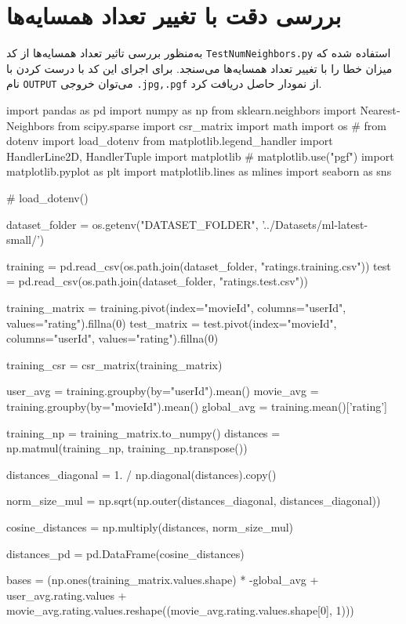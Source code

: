 \chapter{بررسی دقت با تغییر تعداد همسایه‌ها}

به‌منظور بررسی تاثیر تعداد همسایه‌ها از کد
\verb;TestNumNeighbors.py;
استفاده شده که میزان خطا را با تغییر تعداد همسایه‌ها می‌سنجد.
برای اجرای این کد با درست کردن
با نام
\verb;OUTPUT;
می‌توان خروجی
\verb;.jpg,.pgf;
از نمودار حاصل دریافت کرد.

\begin{latin}
  \begin{python}

import pandas as pd
import numpy as np
from sklearn.neighbors import NearestNeighbors
from scipy.sparse import csr_matrix
import math
import os
#  from dotenv import load_dotenv
from matplotlib.legend_handler import HandlerLine2D, HandlerTuple
import matplotlib
#  matplotlib.use("pgf")
import matplotlib.pyplot as plt
import matplotlib.lines as mlines
import seaborn as sns


#  load_dotenv()

dataset_folder = os.getenv("DATASET_FOLDER", '../Datasets/ml-latest-small/')

training = pd.read_csv(os.path.join(dataset_folder, "ratings.training.csv"))
test = pd.read_csv(os.path.join(dataset_folder, "ratings.test.csv"))

training_matrix = training.pivot(index="movieId", columns="userId",
        values="rating").fillna(0)
test_matrix = test.pivot(index="movieId", columns="userId",
        values="rating").fillna(0)

training_csr = csr_matrix(training_matrix)


user_avg = training.groupby(by="userId").mean()
movie_avg = training.groupby(by="movieId").mean()
global_avg = training.mean()['rating']

training_np = training_matrix.to_numpy()
distances = np.matmul(training_np, training_np.transpose())

distances_diagonal = 1. / np.diagonal(distances).copy()

norm_size_mul = np.sqrt(np.outer(distances_diagonal, distances_diagonal))

cosine_distances = np.multiply(distances, norm_size_mul)

distances_pd = pd.DataFrame(cosine_distances)

bases = (np.ones(training_matrix.values.shape) * -global_avg +
        user_avg.rating.values +
        movie_avg.rating.values.reshape((movie_avg.rating.values.shape[0], 1)))


\end{python}
\end{latin}
